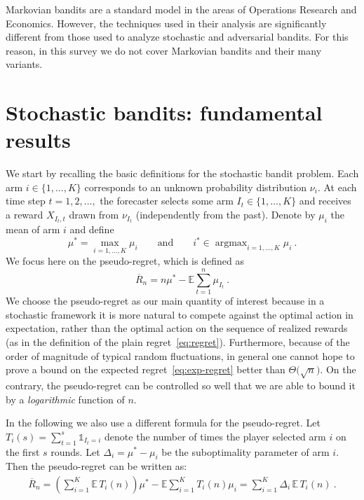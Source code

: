 \documentclass[11pt]{hackednow}
\newcommand{\E}{\mathbb{E}}
\newcommand{\oR}{\overline{R}}
\def\ds1{\mathds{1}}
\newcommand{\argmax}{\mathop{\mathrm{argmax}}}
\begin{document}
Markovian bandits are a standard model in the areas of Operations Research and Economics. However, the techniques used in their analysis are significantly different from those used to analyze stochastic and adversarial bandits. For this reason, in this survey we do not cover Markovian bandits and their many variants.
 
\chapter{Stochastic bandits: fundamental results}
\label{stochastic}
We start by recalling the basic definitions for the stochastic bandit problem. Each arm $i \in \{1, \hdots, K\}$ corresponds to an unknown probability distribution $\nu_i$. At each time step $t =1, 2, \hdots,$ the forecaster selects some arm $I_t \in \{1, \hdots, K\}$ and receives a reward $X_{I_t,t}$ drawn from $\nu_{I_t}$ (independently from the past). Denote by $\mu_i$ the mean of arm $i$ and define
\[
    \mu^*=\max_{i=1,\hdots,K} \mu_i \qquad\text{and}\qquad i^* \in \argmax_{i=1,\hdots,K} \mu_i~.
\]
We focus here on the pseudo-regret, which is defined as
\begin{equation} \label{eq:pseudoregretstocha}
\oR_n = n \mu^* - \E \sum_{t=1}^n \mu_{I_t}~.
\end{equation}
We choose the pseudo-regret as our main quantity of interest because in a stochastic framework it is more natural to compete against the optimal action in expectation, rather than the optimal action on the sequence of realized rewards (as in the definition of the plain regret~\eqref{eq:regret}). Furthermore, because of the order of magnitude of typical random fluctuations, in general one cannot hope to prove a bound on the expected regret~\eqref{eq:exp-regret} better than $\Theta\bigl(\sqrt{n}\bigr)$. On the contrary, the pseudo-regret can be controlled so well that we are able to bound it by a \textsl{logarithmic} function of $n$.

In the following we also use a different formula for the pseudo-regret. Let $T_{i}(s)=\sum_{t=1}^s \ds1_{I_t=i}$ denote the number of times the player selected arm $i$ on the first $s$ rounds. Let $\Delta_i = \mu^*-\mu_i$ be the suboptimality parameter of arm $i$. Then the pseudo-regret can be written as:
\begin{align*}
\oR_n =
\left( \sum_{i=1}^K \E\,T_i(n) \right) \mu^* - \E \sum_{i=1}^K T_i(n) \mu_i = \sum_{i=1}^K \Delta_i\, \E\,T_i(n)~.
\end{align*}
\end{document}
